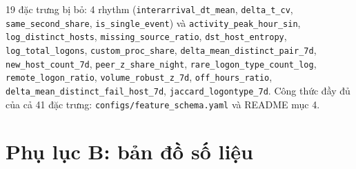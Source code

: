 \documentclass[
  11pt,
]{article}
\begin{document}
19 đặc trưng bị bỏ: 4 rhythm
(\texttt{interarrival\_\allowbreak{}dt\_\allowbreak{}mean},
\texttt{delta\_\allowbreak{}t\_\allowbreak{}cv},
\texttt{same\_\allowbreak{}second\_\allowbreak{}share},
\texttt{is\_\allowbreak{}single\_\allowbreak{}event}) và
\texttt{activity\_\allowbreak{}peak\_\allowbreak{}hour\_\allowbreak{}sin},
\texttt{log\_\allowbreak{}distinct\_\allowbreak{}hosts},
\texttt{missing\_\allowbreak{}source\_\allowbreak{}ratio},
\texttt{dst\_\allowbreak{}host\_\allowbreak{}entropy},
\texttt{log\_\allowbreak{}total\_\allowbreak{}logons},
\texttt{custom\_\allowbreak{}proc\_\allowbreak{}share},
\texttt{delta\_\allowbreak{}mean\_\allowbreak{}distinct\_\allowbreak{}pair\_\allowbreak{}7d},
\texttt{new\_\allowbreak{}host\_\allowbreak{}count\_\allowbreak{}7d},
\texttt{peer\_\allowbreak{}z\_\allowbreak{}share\_\allowbreak{}night},
\texttt{rare\_\allowbreak{}logon\_\allowbreak{}type\_\allowbreak{}count\_\allowbreak{}log},
\texttt{remote\_\allowbreak{}logon\_\allowbreak{}ratio},
\texttt{volume\_\allowbreak{}robust\_\allowbreak{}z\_\allowbreak{}7d},
\texttt{off\_\allowbreak{}hours\_\allowbreak{}ratio},
\texttt{delta\_\allowbreak{}mean\_\allowbreak{}distinct\_\allowbreak{}fail\_\allowbreak{}host\_\allowbreak{}7d},
\texttt{jaccard\_\allowbreak{}logontype\_\allowbreak{}7d}. Công thức đầy
đủ của cả 41 đặc trưng:
\texttt{configs/\allowbreak{}feature\_\allowbreak{}schema.\allowbreak{}yaml}
và README mục 4.

\hypertarget{phux1ee5-lux1ee5c-b-bux1ea3n-ux111ux1ed3-sux1ed1-liux1ec7u}{%
\section{Phụ lục B: bản đồ số
liệu}\label{phux1ee5-lux1ee5c-b-bux1ea3n-ux111ux1ed3-sux1ed1-liux1ec7u}}
\end{document}

